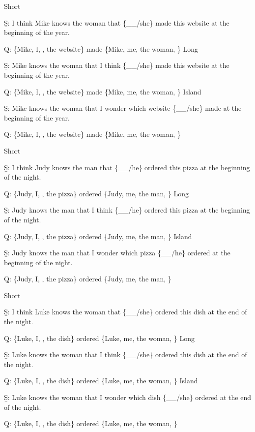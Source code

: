 \pex 
\a Short\par\nobreak
\beginsubsub 
\b{S:} I think Mike knows the woman that \{\_\_/she\} made this website at the beginning of the year.\par\nobreak
\b{Q:} \{Mike, I, , the website\} made \{Mike, me, the woman, \}
\endsubsub
\a Long\par\nobreak
\beginsubsub
\b{S:} Mike knows the woman that I think \{\_\_/she\} made this website at the beginning of the year.\par\nobreak
\b{Q:} \{Mike, I, , the website\} made \{Mike, me, the woman, \}
\endsubsub
\a Island\par\nobreak
\beginsubsub
\b{S:} Mike knows the woman that I wonder which website \{\_\_/she\} made at the beginning of the year.\par\nobreak
\b{Q:} \{Mike, I, , the website\} made \{Mike, me, the woman, \}
\endsubsub
\xe

\pex 
\a Short\par\nobreak
\beginsubsub 
\b{S:} I think Judy knows the man that \{\_\_/he\} ordered this pizza at the beginning of the night.\par\nobreak
\b{Q:} \{Judy, I, , the pizza\} ordered \{Judy, me, the man, \}
\endsubsub
\a Long\par\nobreak
\beginsubsub
\b{S:} Judy knows the man that I think \{\_\_/he\} ordered this pizza at the beginning of the night.\par\nobreak
\b{Q:} \{Judy, I, , the pizza\} ordered \{Judy, me, the man, \}
\endsubsub
\a Island\par\nobreak
\beginsubsub
\b{S:} Judy knows the man that I wonder which pizza \{\_\_/he\} ordered at the beginning of the night.\par\nobreak
\b{Q:} \{Judy, I, , the pizza\} ordered \{Judy, me, the man, \}
\endsubsub
\xe

\pex 
\a Short\par\nobreak
\beginsubsub 
\b{S:} I think Luke knows the woman that \{\_\_/she\} ordered this dish at the end of the night.\par\nobreak
\b{Q:} \{Luke, I, , the dish\} ordered \{Luke, me, the woman, \}
\endsubsub
\a Long\par\nobreak
\beginsubsub
\b{S:} Luke knows the woman that I think \{\_\_/she\} ordered this dish at the end of the night.\par\nobreak
\b{Q:} \{Luke, I, , the dish\} ordered \{Luke, me, the woman, \}
\endsubsub
\a Island\par\nobreak
\beginsubsub
\b{S:} Luke knows the woman that I wonder which dish \{\_\_/she\} ordered at the end of the night.\par\nobreak
\b{Q:} \{Luke, I, , the dish\} ordered \{Luke, me, the woman, \}
\endsubsub
\xe

